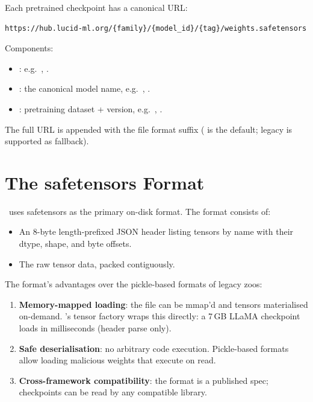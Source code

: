 Each pretrained checkpoint has a canonical URL:

\begin{lstlisting}[style=lucid,language=LucidPython]
https://hub.lucid-ml.org/{family}/{model_id}/{tag}/weights.safetensors
\end{lstlisting}

Components:
\begin{itemize}
  \item {}: e.g.\ ,
    .
  \item {}: the canonical model name, e.g.\
    , .
  \item {}: pretraining dataset + version, e.g.\
    , .
\end{itemize}

The full URL is appended with the file format suffix
( is the default;  legacy is
supported as fallback).

\section{The safetensors Format}
\label{sec:pretrained:safetensors}

\Lucid\ uses safetensors \cite{safetensors} as the primary
on-disk format. The format consists of:

\begin{itemize}
  \item An 8-byte length-prefixed JSON header listing tensors
    by name with their dtype, shape, and byte offsets.
  \item The raw tensor data, packed contiguously.
\end{itemize}

The format's advantages over the pickle-based
\cite{pickle_python} formats of legacy zoos:

\begin{enumerate}
  \item \textbf{Memory-mapped loading}: the file can be mmap'd
    and tensors materialised on-demand. \Lucid's tensor
    factory wraps this directly: a 7\,GB LLaMA checkpoint
    loads in milliseconds (header parse only).
  \item \textbf{Safe deserialisation}: no arbitrary code
    execution. Pickle-based formats allow loading malicious
    weights that execute on read.
  \item \textbf{Cross-framework compatibility}: the format is
    a published spec; checkpoints can be read by any compatible
    library.
\end{enumerate}

